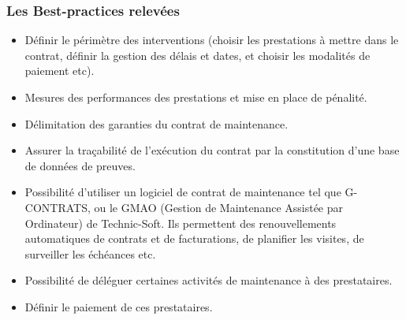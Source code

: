 \subsubsection{Les Best-practices relevées}
\begin{itemize}
	\item Définir le périmètre des interventions (choisir les prestations à mettre dans le contrat, définir la gestion des délais et dates, et choisir les modalités de paiement etc).
	\item Mesures des performances des prestations et mise en place de pénalité.
	\item Délimitation des garanties du contrat de maintenance.
	\item Assurer la traçabilité de l'exécution du contrat par la constitution d'une base de données de preuves.
	\item Possibilité d'utiliser un logiciel de contrat de maintenance tel que G-CONTRATS, ou le GMAO (Gestion de Maintenance Assistée par Ordinateur) de Technic-Soft. Ils permettent des renouvellements automatiques de contrats et de facturations, de planifier les visites, de surveiller les échéances etc.
	\item Possibilité de déléguer certaines activités de maintenance à des prestataires. 
	\item Définir le paiement de ces prestataires.
\end{itemize}